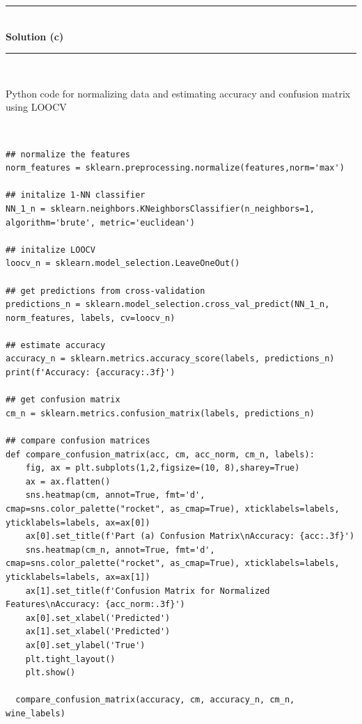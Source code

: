 \documentclass{article}
\begin{document}
\noindent\rule{\textwidth}{0.4pt}\\

\textbf{Solution (c)}

\noindent\rule{\textwidth}{0.4pt}\\

\parbox{\textwidth}{Python code for normalizing data and estimating accuracy and confusion matrix using LOOCV}\\
\begin{center}
\begin{lstlisting}
## normalize the features
norm_features = sklearn.preprocessing.normalize(features,norm='max')
  
## initalize 1-NN classifier
NN_1_n = sklearn.neighbors.KNeighborsClassifier(n_neighbors=1, algorithm='brute', metric='euclidean')
  
## initalize LOOCV
loocv_n = sklearn.model_selection.LeaveOneOut()
  
## get predictions from cross-validation
predictions_n = sklearn.model_selection.cross_val_predict(NN_1_n, norm_features, labels, cv=loocv_n)
  
## estimate accuracy
accuracy_n = sklearn.metrics.accuracy_score(labels, predictions_n)
print(f'Accuracy: {accuracy:.3f}')
  
## get confusion matrix
cm_n = sklearn.metrics.confusion_matrix(labels, predictions_n)
  
## compare confusion matrices
def compare_confusion_matrix(acc, cm, acc_norm, cm_n, labels):
    fig, ax = plt.subplots(1,2,figsize=(10, 8),sharey=True)
    ax = ax.flatten()
    sns.heatmap(cm, annot=True, fmt='d', cmap=sns.color_palette("rocket", as_cmap=True), xticklabels=labels, yticklabels=labels, ax=ax[0])
    ax[0].set_title(f'Part (a) Confusion Matrix\nAccuracy: {acc:.3f}')
    sns.heatmap(cm_n, annot=True, fmt='d', cmap=sns.color_palette("rocket", as_cmap=True), xticklabels=labels, yticklabels=labels, ax=ax[1])
    ax[1].set_title(f'Confusion Matrix for Normalized Features\nAccuracy: {acc_norm:.3f}')
    ax[0].set_xlabel('Predicted')
    ax[1].set_xlabel('Predicted')
    ax[0].set_ylabel('True')
    plt.tight_layout()
    plt.show()
  
  compare_confusion_matrix(accuracy, cm, accuracy_n, cm_n, wine_labels)
\end{lstlisting}
\end{center}
\end{document}
